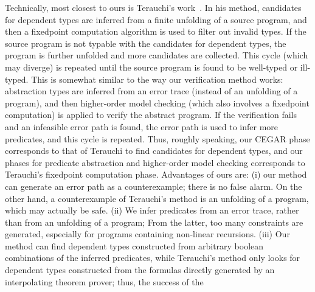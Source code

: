 Technically, most closest to ours is Terauchi's work~\cite{Terauchi2010}. 
In his method, candidates for dependent types are inferred from a finite 
unfolding of a source program,
and then a fixedpoint computation algorithm is used to filter out 
invalid types. If the source program is not typable with the candidates 
for dependent types, the program is further unfolded and more candidates 
are collected. This cycle (which may diverge) is repeated until the 
source program is found to be well-typed or ill-typed. This is somewhat 
similar to the way our verification method works: abstraction types are 
inferred from an error trace (instead of an unfolding of a program), and 
then higher-order model checking (which also involves a fixedpoint 
computation) is applied to verify the abstract program. If the 
verification fails and an infeasible error path is found, the error path 
is used to infer more predicates, and this cycle is repeated. Thus, 
roughly speaking, our CEGAR phase corresponds to that of Terauchi to 
find candidates for dependent types, and our phases for predicate 
abstraction and higher-order model checking corresponds to Terauchi's 
fixedpoint computation phase.
Advantages of ours are: (i) our method can generate an error path as a 
counterexample; there is no false alarm. On the other hand, a 
counterexample of Terauchi's method is an unfolding of a program, which 
may actually be safe. (ii) We infer predicates from an error trace, 
rather than from an unfolding of a program; From the latter, too many 
constraints are generated, especially for programs containing non-linear 
recursions.
(iii) Our method can find dependent types constructed from arbitrary 
boolean combinations of the inferred predicates, while Terauchi's method 
only looks for dependent types constructed from the formulas directly 
generated by an interpolating theorem prover; thus, the success of the 
